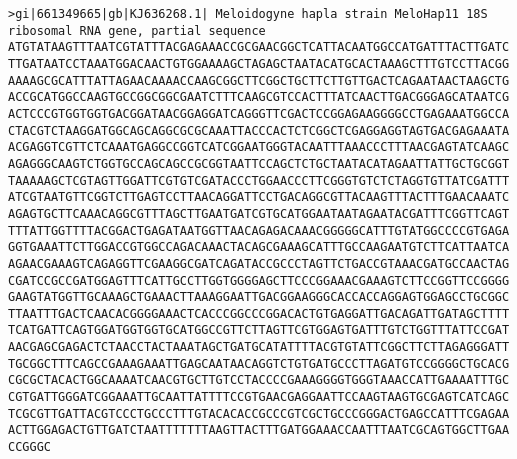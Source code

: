 \documentclass[11pt]{article}
\begin{document}
\begin{Verbatim}[commandchars=\\\{\}]
>gi|661349665|gb|KJ636268.1| Meloidogyne hapla strain MeloHap11 18S ribosomal RNA gene, partial sequence
ATGTATAAGTTTAATCGTATTTACGAGAAACCGCGAACGGCTCATTACAATGGCCATGATTTACTTGATC
TTGATAATCCTAAATGGACAACTGTGGAAAAGCTAGAGCTAATACATGCACTAAAGCTTTGTCCTTACGG
AAAAGCGCATTTATTAGAACAAAACCAAGCGGCTTCGGCTGCTTCTTGTTGACTCAGAATAACTAAGCTG
ACCGCATGGCCAAGTGCCGGCGGCGAATCTTTCAAGCGTCCACTTTATCAACTTGACGGGAGCATAATCG
ACTCCCGTGGTGGTGACGGATAACGGAGGATCAGGGTTCGACTCCGGAGAAGGGGCCTGAGAAATGGCCA
CTACGTCTAAGGATGGCAGCAGGCGCGCAAATTACCCACTCTCGGCTCGAGGAGGTAGTGACGAGAAATA
ACGAGGTCGTTCTCAAATGAGGCCGGTCATCGGAATGGGTACAATTTAAACCCTTTAACGAGTATCAAGC
AGAGGGCAAGTCTGGTGCCAGCAGCCGCGGTAATTCCAGCTCTGCTAATACATAGAATTATTGCTGCGGT
TAAAAAGCTCGTAGTTGGATTCGTGTCGATACCCTGGAACCCTTCGGGTGTCTCTAGGTGTTATCGATTT
ATCGTAATGTTCGGTCTTGAGTCCTTAACAGGATTCCTGACAGGCGTTACAAGTTTACTTTGAACAAATC
AGAGTGCTTCAAACAGGCGTTTAGCTTGAATGATCGTGCATGGAATAATAGAATACGATTTCGGTTCAGT
TTTATTGGTTTTACGGACTGAGATAATGGTTAACAGAGACAAACGGGGGCATTTGTATGGCCCCGTGAGA
GGTGAAATTCTTGGACCGTGGCCAGACAAACTACAGCGAAAGCATTTGCCAAGAATGTCTTCATTAATCA
AGAACGAAAGTCAGAGGTTCGAAGGCGATCAGATACCGCCCTAGTTCTGACCGTAAACGATGCCAACTAG
CGATCCGCCGATGGAGTTTCATTGCCTTGGTGGGGAGCTTCCCGGAAACGAAAGTCTTCCGGTTCCGGGG
GAAGTATGGTTGCAAAGCTGAAACTTAAAGGAATTGACGGAAGGGCACCACCAGGAGTGGAGCCTGCGGC
TTAATTTGACTCAACACGGGGAAACTCACCCGGCCCGGACACTGTGAGGATTGACAGATTGATAGCTTTT
TCATGATTCAGTGGATGGTGGTGCATGGCCGTTCTTAGTTCGTGGAGTGATTTGTCTGGTTTATTCCGAT
AACGAGCGAGACTCTAACCTACTAAATAGCTGATGCATATTTTACGTGTATTCGGCTTCTTAGAGGGATT
TGCGGCTTTCAGCCGAAAGAAATTGAGCAATAACAGGTCTGTGATGCCCTTAGATGTCCGGGGCTGCACG
CGCGCTACACTGGCAAAATCAACGTGCTTGTCCTACCCCGAAAGGGGTGGGTAAACCATTGAAAATTTGC
CGTGATTGGGATCGGAAATTGCAATTATTTTCCGTGAACGAGGAATTCCAAGTAAGTGCGAGTCATCAGC
TCGCGTTGATTACGTCCCTGCCCTTTGTACACACCGCCCGTCGCTGCCCGGGACTGAGCCATTTCGAGAA
ACTTGGAGACTGTTGATCTAATTTTTTTAAGTTACTTTGATGGAAACCAATTTAATCGCAGTGGCTTGAA
CCGGGC


\end{Verbatim}
\end{document}
